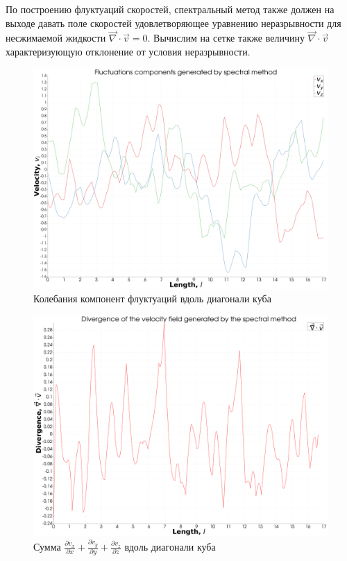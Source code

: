 По построению флуктуаций скоростей, спектральный метод также должен на выходе давать поле скоростей удовлетворяющее уравнению неразрывности для несжимаемой жидкости $\vec \nabla \cdot \vec v = 0$. Вычислим на сетке также величину $\vec \nabla \cdot \vec v$ характеризующую отклонение от условия неразрывности. 

\begin{figure}[ht] 
    \center
    \includegraphics [width=0.8\linewidth] {images/spectral/velocity_components.png}
    \caption{Колебания компонент флуктуаций вдоль диагонали куба} 
    \label{img:spectral_method_velocity_components_along_diagonal}  
\end{figure}

\begin{figure}[ht] 
    \center
    \includegraphics [width=0.8\linewidth] {images/spectral/divergence.png}
    \caption{Сумма $\frac{\partial v_x}{\partial x} + \frac{\partial v_y}{\partial y} + \frac{\partial v_z}{\partial z}$ вдоль диагонали куба} 
    \label{img:spectral_method_velocity_field_divergence}  
\end{figure}

